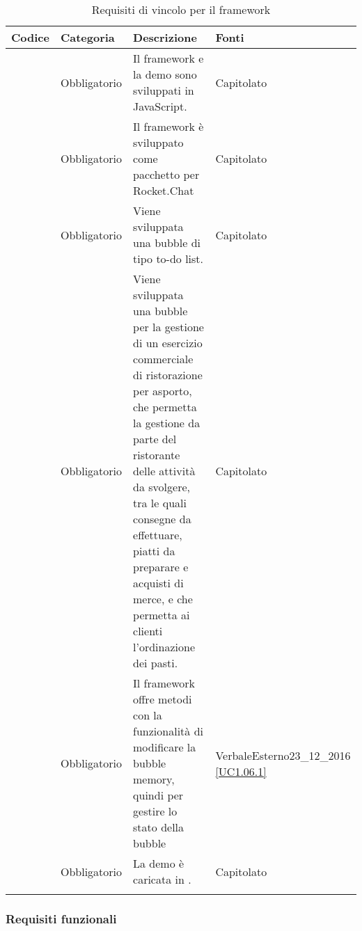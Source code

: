 \begin{longtable}{|P{1.5cm}|P{2.5cm}|P{6.5cm}|P{2.5cm}|}
	\hline \textbf{Codice} & \textbf{Categoria} & \textbf{Descrizione} & \textbf{Fonti} \\
	\hline \RequisitoObV\label{L1} & Obbligatorio & Il framework e la demo sono sviluppati in JavaScript. & Capitolato \\
	\hline \RequisitoObV \label{L2} & Obbligatorio & Il framework è sviluppato come pacchetto per Rocket.Chat & Capitolato \\
	\hline \RequisitoObV\label{L3} & Obbligatorio & Viene sviluppata una bubble di tipo to-do list. & Capitolato \\
	\hline \RequisitoObV\label{L4} & Obbligatorio & Viene sviluppata una bubble per la gestione di un esercizio commerciale di ristorazione per asporto, che permetta la gestione da parte del ristorante delle attività da svolgere, tra le quali consegne da effettuare, piatti da preparare e acquisti di merce, e che permetta ai clienti l'ordinazione dei pasti. & Capitolato \\
	\hline \RequisitoObV\label{L5} & Obbligatorio & Il framework offre metodi con la funzionalità di modificare la bubble memory, quindi per gestire lo stato della bubble & VerbaleEsterno23\_12\_2016 \linebreak \ref{UC1.06.1}  \\
	\hline \RequisitoObV\label{L54} & Obbligatorio & La demo è caricata in . & Capitolato \\
	\hline
	\caption{Requisiti di vincolo per il framework}
\end{longtable}

\subsubsection{Requisiti funzionali}


